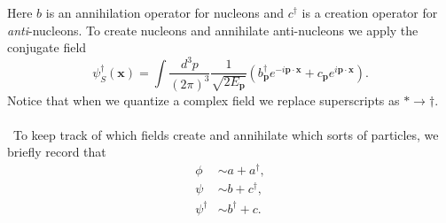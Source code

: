 \documentclass[12 pt]{article}
\newcommand{\B}[1]{\mathbf{#1}}
\newcommand{\LP}{\left(}
\newcommand{\RP}{\right)}
\numberwithin{equation}{section}
\begin{document}
Here $b$ is an annihilation operator for nucleons and $c^\dagger$ is a creation operator for \textit{anti}-nucleons. To create nucleons and annihilate anti-nucleons we apply the conjugate field 
\begin{equation*}
\psi^\dagger_S (\B{x}) =  \int \frac{d^3 p}{(2 \pi)^3} \frac{1}{\sqrt{2 E_\B{p}}} \LP b^\dagger_{\B{p}} e^{- i \B{p} \cdot \B{x}} + c_{\B{p}} e^{i \B{p} \cdot \B{x}} \RP.
\end{equation*}
Notice that when we quantize a complex field we replace superscripts as $* \rightarrow \dagger$.\\
\\
\
To keep track of which fields create and annihilate which sorts of particles, we briefly record that \begin{align*}
\phi & \sim a + a^\dagger, \\
\psi & \sim b + c^\dagger, \\
\psi^\dagger & \sim b^\dagger + c.
\end{align*}
\end{document}
